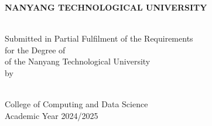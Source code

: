 \makeatletter
\begin{titlepage}
\begin{center}

\uppercase{\textbf{\large{Nanyang Technological University}}}
\\[6cm]

\uppercase{\textbf{\fypcode \\[0.3cm]\@title}}

\vfill

Submitted in Partial Fulfilment of the Requirements\\
for the Degree of \degree\\
of the Nanyang Technological University
\\[0.8cm]
by
\\[0.8cm]

\@author
\\[2cm]

\end{center}

College of Computing and Data Science\\
Academic Year 2024/2025
\end{titlepage}
\makeatother
